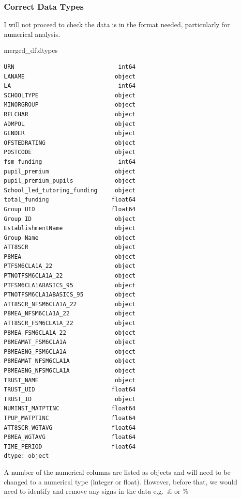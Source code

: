 \documentclass[
  letterpaper,
  DIV=11,
  numbers=noendperiod]{scrartcl}
\newenvironment{Shaded}{\begin{snugshade}}{\end{snugshade}}
\newcommand{\NormalTok}[1]{\textcolor[rgb]{0.00,0.23,0.31}{#1}}
\begin{document}
\subsubsection{Correct Data Types}\label{correct-data-types}

I will not proceed to check the data is in the format needed,
particularly for numerical analysis.

\begin{Shaded}
\begin{Highlighting}[]
\NormalTok{merged\_df.dtypes}
\end{Highlighting}
\end{Shaded}

\begin{verbatim}
URN                              int64
LANAME                          object
LA                               int64
SCHOOLTYPE                      object
MINORGROUP                      object
RELCHAR                         object
ADMPOL                          object
GENDER                          object
OFSTEDRATING                    object
POSTCODE                        object
fsm_funding                      int64
pupil_premium                   object
pupil_premium_pupils            object
School_led_tutoring_funding     object
total_funding                  float64
Group UID                      float64
Group ID                        object
EstablishmentName               object
Group Name                      object
ATT8SCR                         object
P8MEA                           object
PTFSM6CLA1A_22                  object
PTNOTFSM6CLA1A_22               object
PTFSM6CLA1ABASICS_95            object
PTNOTFSM6CLA1ABASICS_95         object
ATT8SCR_NFSM6CLA1A_22           object
P8MEA_NFSM6CLA1A_22             object
ATT8SCR_FSM6CLA1A_22            object
P8MEA_FSM6CLA1A_22              object
P8MEAMAT_FSM6CLA1A              object
P8MEAENG_FSM6CLA1A              object
P8MEAMAT_NFSM6CLA1A             object
P8MEAENG_NFSM6CLA1A             object
TRUST_NAME                      object
TRUST_UID                      float64
TRUST_ID                        object
NUMINST_MATPTINC               float64
TPUP_MATPTINC                  float64
ATT8SCR_WGTAVG                 float64
P8MEA_WGTAVG                   float64
TIME_PERIOD                    float64
dtype: object
\end{verbatim}

A number of the numerical columns are listed as objects and will need to
be changed to a numerical type (integer or float). However, before that,
we would need to identify and remove any signs in the data e.g.~£ or \%
\end{document}
